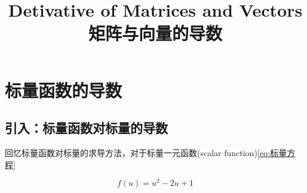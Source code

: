 \documentclass[withoutpreface,bwprint]{NoteBook}
\title{Detivative of Matrices and Vectors 矩阵与向量的导数}  %
\begin{document}
\maketitle











\section{标量函数的导数}
\subsection{引入：标量函数对标量的导数}
回忆标量函数对标量的求导方法，对于标量一元函数(scalar function)\cref{eq:标量方程}

\begin{equation}
    \label{eq:标量方程}  %
    f(u) = u^2 - 2u + 1
\end{equation}
\end{document}
